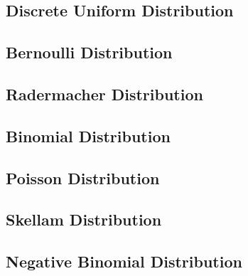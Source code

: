 \documentclass[11pt]{report} %
\begin{document}
\subsection{Discrete Uniform Distribution}

\subsection{Bernoulli Distribution}

\subsection{Radermacher Distribution}

\subsection{Binomial Distribution}

\subsection{Poisson Distribution}

\subsection{Skellam Distribution}

\subsection{Negative Binomial Distribution}
\end{document}
